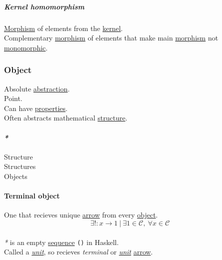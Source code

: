 \documentclass[11pt]{article}
\begin{document}
\subparagraph{\label{org75f3b13}Kernel homomorphism}
\label{sec:orgf2a090b}
\hyperref[org5de09d4]{Morphism} of elements from the \hyperref[org8fd3800]{kernel}.\\
Complementary \hyperref[org5de09d4]{morphism} of elements that make main \hyperref[org5de09d4]{morphism} not \hyperref[orgc646917]{monomorphic}.\\

\subsubsection{\label{org4be0e9d}Object}
\label{sec:orgef3d89b}
Absolute \hyperref[org3470ee4]{abstraction}.\\

Point.\\

Can have \hyperref[org85fb3a1]{properties}.\\

Often abstracts mathematical \hyperref[org8051f61]{structure}.\\

\paragraph{\emph{*}}
\label{sec:org01dd1a4}

\label{org8051f61}Structure\\
\label{orgc87c48c}Structures\\
\label{org363acc2}Objects\\

\paragraph{\label{org84bb7e1}Terminal object}
\label{sec:org3b45281}
One that recieves unique \hyperref[org03967f4]{arrow} from every \hyperref[org4be0e9d]{object}.\\

$$ \exists ! : x \to 1 \ | \ \exists 1 \in \mathcal{C}, \ \forall x \in \mathcal{C}$$\\

\emph{*} is an empty \hyperref[org522d1b0]{sequence} \texttt{()} in Haskell.\\

Called a \emph{\hyperref[org0b3ee46]{unit}}, so recieves \emph{terminal} or \emph{\hyperref[org0b3ee46]{unit}} \hyperref[org03967f4]{arrow}.\\
\end{document}
